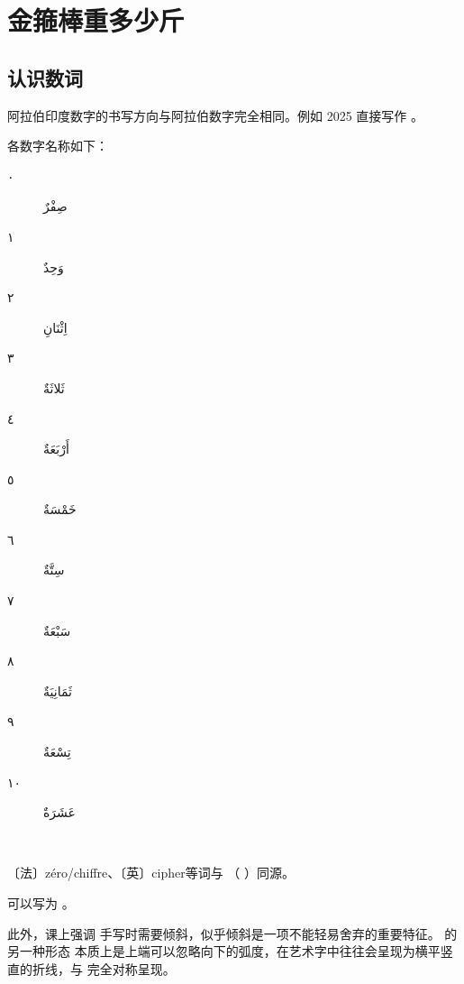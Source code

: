 \chapter{金箍棒重多少斤}

\section{ 认识数词}


阿拉伯印度数字的书写方向与阿拉伯数字完全相同。例如 2025 直接写作 。

各数字名称如下：

\begin{Arabic}
    \begin{multicols}{3}
    \begin{description}
        \item[٠] صِفْرٌ
        \item[١] وَحِدٌ
        \item[٢] اِثْنَانِ
        \item[٣] ثَلاثَةٌ
        \item[٤] أَرْبَعَةٌ
        \item[٥] خَمْسَةٌ
        \item[٦] سِتَّةٌ
        \item[٧] سَبْعَةٌ
        \item[٨] ثَمَانِيَةٌ
        \item[٩] تِسْعَةٌ
        \item[١٠] عَشَرَةٌ
        \item[~] 
    \end{description}
    \end{multicols}
\end{Arabic}

〔法〕zéro/chiffre、〔英〕cipher等词与 （  ）同源。

\newfontfamily{}

\begin{attention}
     可以写为 。
\end{attention}

\begin{note}
    此外，课上强调  手写时需要倾斜，似乎倾斜是一项不能轻易舍弃的重要特征。  的另一种形态  本质上是上端可以忽略向下的弧度，在艺术字中往往会呈现为横平竖直的折线，与  完全对称呈现。
\end{note}

